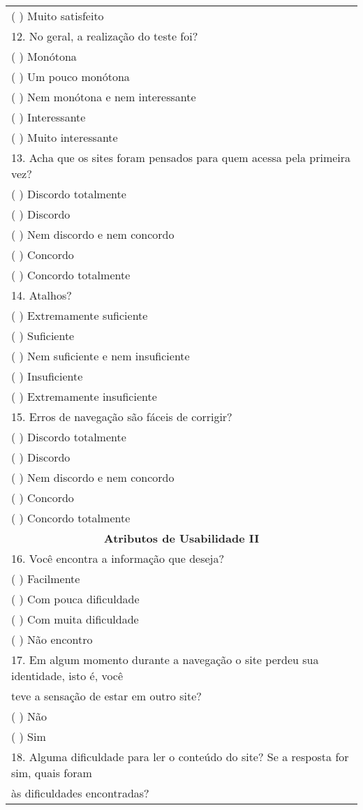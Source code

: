 \begin{center}
\begin{longtable}{l}
(  ) Muito satisfeito \\ 
12. No geral, a realização do teste foi?  \\ 
(  ) Monótona \\ 
(  ) Um pouco monótona \\ 
(  ) Nem monótona e nem interessante \\ 
(  ) Interessante \\ 
(  ) Muito interessante \\ 
13. Acha que os sites foram pensados para quem acessa pela primeira vez?  \\ 
(  ) Discordo totalmente \\ 
(  ) Discordo \\ 
(  ) Nem discordo e nem concordo \\ 
(  ) Concordo \\ 
(  ) Concordo totalmente \\ 
14. Atalhos?  \\ 
(  ) Extremamente suficiente \\ 
(  ) Suficiente \\ 
(  ) Nem suficiente e nem insuficiente \\ 
(  ) Insuficiente \\ 
(  ) Extremamente insuficiente \\ 
15. Erros de navegação são fáceis de corrigir?  \\ 
(  ) Discordo totalmente \\ 
(  ) Discordo \\ 
(  ) Nem discordo e nem concordo \\ 
(  ) Concordo \\ 
(  ) Concordo totalmente \\ 
\multicolumn{1}{c}{\textbf{Atributos de Usabilidade II}} \\ 
16.	Você encontra a informação que deseja? \\ 
(  ) Facilmente \\ 
(  ) Com pouca dificuldade \\ 
(  ) Com muita dificuldade \\ 
(  ) Não encontro \\ 
17.	Em algum momento durante a navegação o site perdeu sua identidade, isto é, você \\teve a sensação de estar em outro site?  \\ 
(   ) Não                     \\ 
(   ) Sim \\ 
18.	Alguma dificuldade para ler o conteúdo do site? Se a resposta for sim, quais foram \\às dificuldades encontradas? \\ 

\end{longtable}
\end{center}
